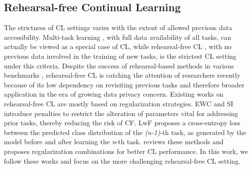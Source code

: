 \subsection{Rehearsal-free Continual Learning}

The strictness of CL settings varies with the extent of allowed previous data accessibility. Multi-task learning \citep{caruana1997multitask}, with full data availability of all tasks, can actually be viewed as a special case of CL, while rehearsal-free CL \citep{smith2023closer}, with no previous data involved in the training of new tasks, is the strictest CL setting under this criteria. Despite the success of rehearsal-based methods in various benchmarks \citep{bang2021rainbow,shin2017continual,belouadah2019il2m}, rehearsal-free CL is catching the attention of researchers recently \citep{smith2023closer} because of its low dependency on revisiting previous tasks and therefore broader application in the era of growing data privacy concern. 
Existing works on rehearsal-free CL are mostly based on regularization strategies.
EWC \citep{kirkpatrick2017overcoming} and SI \citep{zenke2017continual} introduce penalties to restrict the alteration of parameters vital for addressing prior tasks, thereby reducing the risk of CF. 
LwF \citep{li2017learning,rebuffi2017icarl} proposes a cross-entropy loss between the predicted class distribution of the \textit{(n-1)}-th task, as generated by the model before and after learning the \textit{n}-th task. \cite{smith2023closer} reviews these methods and proposes regularization combinations for better CL performance. In this work, we follow these works and focus on the more challenging rehearsal-free CL setting. 

